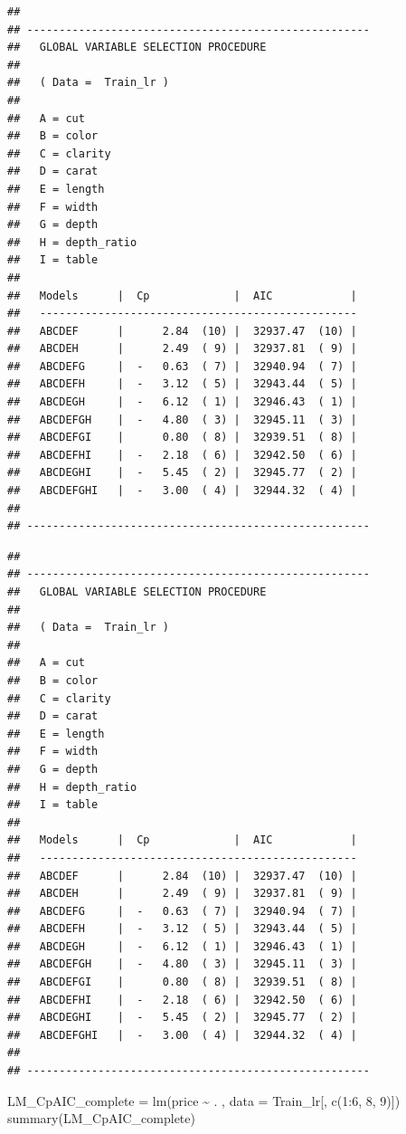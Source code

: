 \documentclass[
]{article}
\newenvironment{Shaded}{\begin{snugshade}}{\end{snugshade}}
\newcommand{\AttributeTok}[1]{\textcolor[rgb]{0.77,0.63,0.00}{#1}}
\newcommand{\DecValTok}[1]{\textcolor[rgb]{0.00,0.00,0.81}{#1}}
\newcommand{\FunctionTok}[1]{\textcolor[rgb]{0.00,0.00,0.00}{#1}}
\newcommand{\NormalTok}[1]{#1}
\newcommand{\OtherTok}[1]{\textcolor[rgb]{0.56,0.35,0.01}{#1}}
\newcommand{\SpecialCharTok}[1]{\textcolor[rgb]{0.00,0.00,0.00}{#1}}
\begin{document}
\begin{verbatim}
## 
## ----------------------------------------------------- 
##   GLOBAL VARIABLE SELECTION PROCEDURE 
## 
##   ( Data =  Train_lr )
## 
##   A = cut              
##   B = color            
##   C = clarity          
##   D = carat            
##   E = length           
##   F = width            
##   G = depth            
##   H = depth_ratio      
##   I = table            
## 
##   Models      |  Cp             |  AIC            |
##   ------------------------------------------------- 
##   ABCDEF      |      2.84  (10) |  32937.47  (10) |
##   ABCDEH      |      2.49  ( 9) |  32937.81  ( 9) |
##   ABCDEFG     |  -   0.63  ( 7) |  32940.94  ( 7) |
##   ABCDEFH     |  -   3.12  ( 5) |  32943.44  ( 5) |
##   ABCDEGH     |  -   6.12  ( 1) |  32946.43  ( 1) |
##   ABCDEFGH    |  -   4.80  ( 3) |  32945.11  ( 3) |
##   ABCDEFGI    |      0.80  ( 8) |  32939.51  ( 8) |
##   ABCDEFHI    |  -   2.18  ( 6) |  32942.50  ( 6) |
##   ABCDEGHI    |  -   5.45  ( 2) |  32945.77  ( 2) |
##   ABCDEFGHI   |  -   3.00  ( 4) |  32944.32  ( 4) |
## 
## -----------------------------------------------------
\end{verbatim}

\begin{verbatim}
## 
## ----------------------------------------------------- 
##   GLOBAL VARIABLE SELECTION PROCEDURE 
## 
##   ( Data =  Train_lr )
## 
##   A = cut              
##   B = color            
##   C = clarity          
##   D = carat            
##   E = length           
##   F = width            
##   G = depth            
##   H = depth_ratio      
##   I = table            
## 
##   Models      |  Cp             |  AIC            |
##   ------------------------------------------------- 
##   ABCDEF      |      2.84  (10) |  32937.47  (10) |
##   ABCDEH      |      2.49  ( 9) |  32937.81  ( 9) |
##   ABCDEFG     |  -   0.63  ( 7) |  32940.94  ( 7) |
##   ABCDEFH     |  -   3.12  ( 5) |  32943.44  ( 5) |
##   ABCDEGH     |  -   6.12  ( 1) |  32946.43  ( 1) |
##   ABCDEFGH    |  -   4.80  ( 3) |  32945.11  ( 3) |
##   ABCDEFGI    |      0.80  ( 8) |  32939.51  ( 8) |
##   ABCDEFHI    |  -   2.18  ( 6) |  32942.50  ( 6) |
##   ABCDEGHI    |  -   5.45  ( 2) |  32945.77  ( 2) |
##   ABCDEFGHI   |  -   3.00  ( 4) |  32944.32  ( 4) |
## 
## -----------------------------------------------------
\end{verbatim}

\begin{Shaded}
\begin{Highlighting}[]
\NormalTok{LM\_CpAIC\_complete }\OtherTok{=} \FunctionTok{lm}\NormalTok{(price }\SpecialCharTok{\textasciitilde{}}\NormalTok{ . , }\AttributeTok{data =}\NormalTok{ Train\_lr[, }\FunctionTok{c}\NormalTok{(}\DecValTok{1}\SpecialCharTok{:}\DecValTok{6}\NormalTok{, }\DecValTok{8}\NormalTok{, }\DecValTok{9}\NormalTok{)])}
\FunctionTok{summary}\NormalTok{(LM\_CpAIC\_complete)}
\end{Highlighting}
\end{Shaded}
\end{document}
